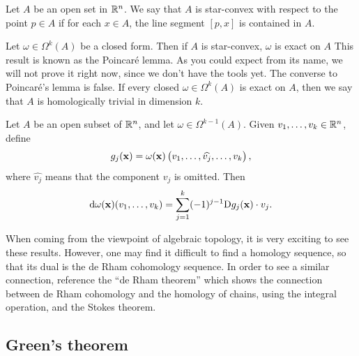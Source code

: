 \documentclass[11pt,a4paper]{article}
\begin{document}
\begin{definition}
  Let $A$ be an open set in $\mathbb{R}^n$.
  We say that $A$ is star-convex with respect to the point $p \in A$
  if for each $x \in A$,
  the line segment $[p,x]$ is contained in $A$.
\end{definition}

\begin{remark}
  Let $\omega \in \Omega^k(A)$ be a closed form.
  Then if $A$ is star-convex, $\omega$ is exact on $A$
  This result is known as the Poincar\'e lemma.
  As you could expect from its name, we will not prove it right now,
  since we don't have the tools yet.
  The converse to Poincar\'e's lemma is false.
  If every closed $\omega \in \Omega^k(A)$ is exact on $A$,
  then we say that $A$ is homologically trivial in dimension $k$.
\end{remark}

\begin{exercise}
  Let $A$ be an open subset of $\mathbb{R}^n$,
  and let $\omega \in \Omega^{k-1}(A)$.
  Given $v_1,\dots,v_k \in \mathbb{R}^n$,
  define
  \[
    g_j(\vec x) = \omega(\vec x)\del{v_1,\dots,\widehat{v_j},\dots,v_k},
  \]
  where $\widehat{v_j}$ means that the component $v_j$ is omitted.
  Then
  \[
    \mathrm{d} \omega(\boldsymbol{\mathbf{x}})(v_1,\dots,v_k) =
    \sum_{j=1}^{k} (-1)^{j-1} \mathrm{D} g_j(\boldsymbol{\mathbf{x}}) \cdot v_j.
  \]
\end{exercise}
\begin{remark}
  When coming from the viewpoint of algebraic topology,
  it is very exciting to see these results.
  However, one may find it difficult to find a homology
  sequence, so that its dual is the de Rham cohomology sequence.
  In order to see a similar connection, reference the ``de Rham theorem''
  which shows the connection between de Rham cohomology
  and the homology of chains, using the integral operation,
  and the Stokes theorem.
\end{remark}

\subsection{Green's theorem}
\end{document}
